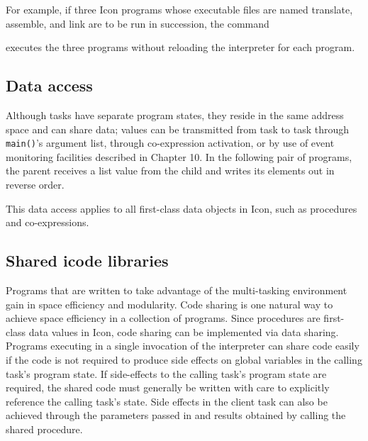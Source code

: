 For example, if three Icon programs whose executable files are named
translate, assemble, and link are to be run in succession, the command 


\noindent
executes the three programs without reloading the interpreter for each
program. 

\subsection{Data access}

Although tasks have separate program states, they reside in the same
address space and can share data; values can be transmitted from task
to task through {\texttt{main()}}'s argument list, through
co-expression activation, or by use of event monitoring facilities
described in Chapter 10. In the following pair of programs, the
parent receives a list value from the child and writes its elements
out in reverse order.


This data access applies to all first-class data objects in Icon, such
as procedures and co-expressions. 

\subsection{Shared icode libraries}

Programs that are written to take advantage of the multi-tasking environment
gain in space efficiency and modularity. Code sharing is one natural way to
achieve space efficiency in a collection of programs. Since procedures are
first-class data values in Icon, code sharing can be implemented via data
sharing. Programs executing in a single invocation of the interpreter can share
code easily if the code is not required to produce side effects on global
variables in the calling task's program state. If side-effects to the calling
task's program state are required, the shared code must generally be written
with care to explicitly reference the calling task's state. Side effects in the
client task can also be achieved through the parameters passed in and results
obtained by calling the shared procedure.

